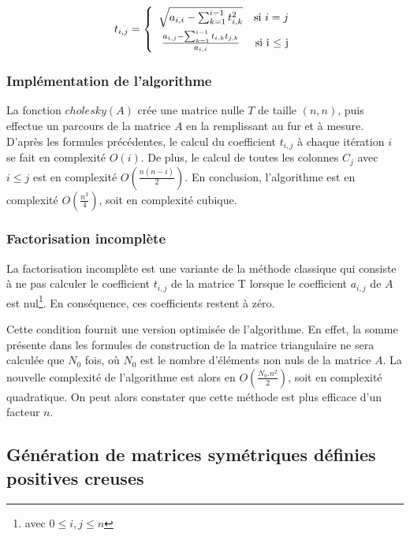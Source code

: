 \documentclass[a4paper]{article}
\begin{document}
\begin{equation*}
t_{i, j} = \left\{
    \begin{array}{cr}
        \rule{0pt}{2.5ex} \sqrt{ a_{i,i} - \sum_{k=1}^{i-1} t_{i,k}^{2}} & \mbox{si } i=j \\
        \rule{0pt}{4ex} \frac{a_{i,j} - \sum_{k=1}^{i-1} t_{i,k}t_{j,k} } {a_{i,i}}& \mbox{si i $\leq$ j}
    \end{array}
\right.
\end{equation*}

\subsubsection{Implémentation de l'algorithme}

La fonction $cholesky(A)$ crée une matrice nulle $T$ de taille $(n,n)$, puis effectue un parcours de la matrice $A$ en la remplissant au fur et à mesure. D'après les formules précédentes, le calcul du coefficient $t_{i,j}$ à chaque itération $i$ se fait en complexité $O(i)$. De plus, le calcul de toutes les colonnes $C_{j}$ avec $i\leq j$ est en complexité $O(\frac{n(n-i)}{2})$. En conclusion, l'algorithme est en complexité $O(\frac{n^{3}}{4})$, soit en complexité cubique.

\subsubsection{Factorisation incomplète}

La factorisation incomplète est une variante de la méthode classique qui consiste à ne pas calculer le coefficient $t_{i,j}$ de la matrice T lorsque le coefficient $a_{i,j}$ de $A$ est nul\footnote{avec $ 0\leq i,j\leq n$}. En conséquence, ces coefficients restent à zéro.

Cette condition fournit une version optimisée de l'algorithme. En effet, la somme présente dans les formules de construction de la matrice triangulaire ne sera calculée que $N_{0}$ fois, où $N_{0}$ est le nombre d'éléments non nuls de la matrice $A$. La nouvelle complexité de l'algorithme est alors en $O(\frac{N_{0}. n^{2}}{2})$, soit en complexité quadratique. On peut alors constater que cette méthode est plus efficace d'un facteur $n$.

\subsection{Génération de matrices symétriques définies positives creuses}
\end{document}
